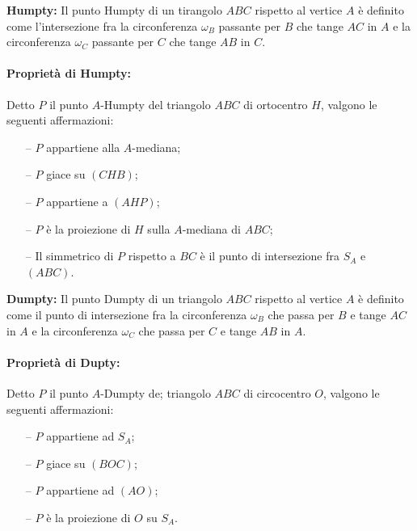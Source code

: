 \documentclass{article}
\begin{document}
\pagestyle{fancy}
\fancyhf{}

\textbf{Humpty:}
Il punto Humpty di un tirangolo $ABC$ rispetto al vertice $A$ è
definito come l'intersezione fra la circonferenza $\omega_B$ passante per $B$
che tange $AC$ in $A$ e la circonferenza $\omega_C$ passante per $C$
che tange $AB$ in $C$.

\paragraph{Proprietà di Humpty:}
Detto $P$ il punto $A$-Humpty del triangolo $ABC$ di ortocentro $H$,
valgono le seguenti affermazioni:
\begin{enumerate}
	\item[--] $P$ appartiene alla $A$-mediana;
	\item[--] $P$ giace su $(CHB)$;
	\item[--] $P$ appartiene a $(AHP)$;
	\item[--] $P$ è la proiezione di $H$ sulla $A$-mediana di $ABC$;
	\item[--] Il simmetrico di $P$ rispetto a $BC$ è il punto di intersezione
		fra $S_A$ e $(ABC)$.
\end{enumerate}

\textbf{Dumpty:}
Il punto Dumpty di un triangolo $ABC$ rispetto al vertice $A$ è
definito come il punto di intersezione fra la circonferenza $\omega_B$
che passa per $B$ e tange $AC$ in $A$ e la circonferenza $\omega_C$
che passa per $C$ e tange $AB$ in $A$.

\paragraph{Proprietà di Dupty:}
Detto $P$ il punto $A$-Dumpty de; triangolo $ABC$ di circocentro $O$,
valgono le seguenti affermazioni:
\begin{enumerate}
	\item[--] $P$ appartiene ad $S_A$;
	\item[--] $P$ giace su $(BOC)$;
	\item[--] $P$ appartiene ad $(AO)$;
	\item[--] $P$ è la proiezione di $O$ su $S_A$.
\end{enumerate}
\end{document}
